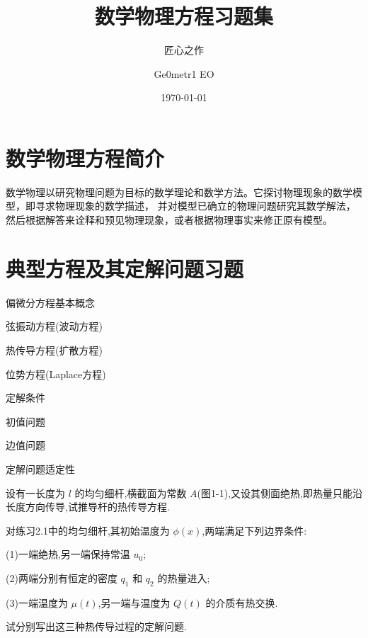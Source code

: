 \documentclass[color=blue,lang=cn,newtx,10pt,scheme=chinese]{elegantbook}
\title{数学物理方程习题集}
\subtitle{匠心之作}
\author{Ge0metr1 EO}
\institute{aaa}
\date{\today}
\begin{document}
\maketitle
\frontmatter

\tableofcontents

\mainmatter

\chapter{数学物理方程简介}%

数学物理以研究物理问题为目标的数学理论和数学方法。它探讨物理现象的数学模型，即寻求物理现象的数学描述，
并对模型已确立的物理问题研究其数学解法，然后根据解答来诠释和预见物理现象，或者根据物理事实来修正原有模型。




\chapter{典型方程及其定解问题习题}%

\begin{introduction}
  \item 偏微分方程基本概念
  \item 弦振动方程(波动方程)
  \item 热传导方程(扩散方程)
  \item 位势方程(Laplace方程)
  \item 定解条件
  \item 初值问题
  \item 边值问题
  \item 定解问题适定性
\end{introduction}
\quad

\begin{exercise}
设有一长度为 $l$ 的均匀细杆,横截面为常数 $A$(图1-1),又设其侧面绝热,即热量只能沿长度方向传导,试推导杆的热传导方程.
\end{exercise}
\quad

\begin{solution}
  
\end{solution}
  
\quad

\begin{exercise}
对练习2.1中的均匀细杆,其初始温度为 $\phi (x)$,两端满足下列边界条件:

(1)一端绝热,另一端保持常温 $u_0$;

(2)两端分别有恒定的密度 $q_1$ 和 $q_2$ 的热量进入;

(3)一端温度为 $\mu (t)$,另一端与温度为 $Q(t)$ 的介质有热交换.

试分别写出这三种热传导过程的定解问题.
\end{exercise}
\quad
\end{document}
